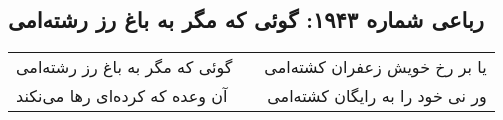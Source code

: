 \begin{center}
\section*{رباعی شماره ۱۹۴۳: گوئی که مگر به باغ رز رشته‌امی}
\label{sec:1943}
\begin{longtable}{l p{0.5cm} r}
گوئی که مگر به باغ رز رشته‌امی
&&
یا بر رخ خویش زعفران کشته‌امی
\\
آن وعده که کرده‌ای رها می‌نکند
&&
ور نی خود را به رایگان کشته‌امی
\\
\end{longtable}
\end{center}
